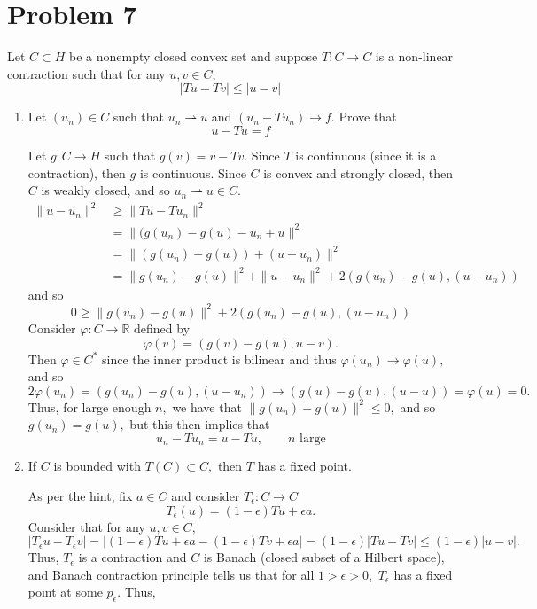 \documentclass[11pt]{article}
\newcommand{\bbR}{\mathbb{R}}
\begin{document}
\section*{Problem 7}
\begin{problem}
    Let $C\subset H$ be a nonempty closed convex set and suppose $T: C \to C$ is a non-linear contraction such that for any $u,v \in C,$
    \[|Tu - Tv|\leq |u-v|\]
\end{problem}
\begin{enumerate}
    \item Let $(u_n)\in C$ such that $u_n \rightharpoonup u$ and $(u_n - Tu_n)\to f.$ Prove that 
    \[u - Tu = f\]
    \begin{solution}
    Let $g: C \to H$ such that $g(v) = v - Tv.$ Since $T$ is continuous (since it is a contraction), then $g$ is continuous.  Since $C$ is convex and strongly closed, then $C$ is weakly closed, and so $u_n \rightharpoonup u \in C.$ 
    \begin{align*}
    \|u- u_n\|^2  &\geq \|Tu - Tu_n\|^2\\
    &=\|(g(u_n) - g(u) - u_n + u\|^2\\
    &=\|(g(u_n) - g(u)) + (u - u_n)\|^2\\
    &= \|g(u_n) - g(u)\|^2 + \|u-u_n\|^2  +2(g(u_n) - g(u), (u-u_n))
    \end{align*}
    and so 
    \[0 \geq \|g(u_n) - g(u)\|^2 + 2(g(u_n) - g(u), (u-u_n))\] Consider $\varphi: C \to \bbR$ defined by 
    \[\varphi(v) = (g(v) - g(u),u - v).\] Then $\varphi \in C^*$ since the inner product is bilinear and thus $\varphi(u_n) \to \varphi(u),$ and so 
    \[2 \varphi(u_n) = (g(u_n) - g(u), (u-u_n)) \to (g(u) - g(u), (u-u)) = \varphi(u) = 0.\] Thus, for large enough $n,$ we have that $\|g(u_n) - g(u)\|^2 \leq 0,$ and so $g(u_n) = g(u),$ but this then implies that 
    \[u_n - Tu_n = u - Tu, \qquad n \text{ large}\]
    \end{solution}
\item If $C$ is bounded with $T(C)\subset C,$ then $T$ has a fixed point.
\begin{solution}
    As per the hint, fix $a\in C$ and consider $T_\epsilon: C \to C$
    \[T_\epsilon(u) = (1-\epsilon)Tu + \epsilon a.\] Consider that for any $u,v \in C,$
    \[|T_\epsilon u - T_\epsilon v| = |(1-\epsilon)Tu + \epsilon a - (1-\epsilon)Tv + \epsilon a| = (1-\epsilon) |Tu - Tv| \leq (1-\epsilon)|u-v|.\] Thus, $T_\epsilon$ is a contraction and $C$ is Banach (closed subset of a Hilbert space), and Banach contraction principle tells us that for all $1>\epsilon>0,$ $T_\epsilon$ has a fixed point at some $p_\epsilon.$ Thus, 

\end{solution}
\end{enumerate}
\end{document}
